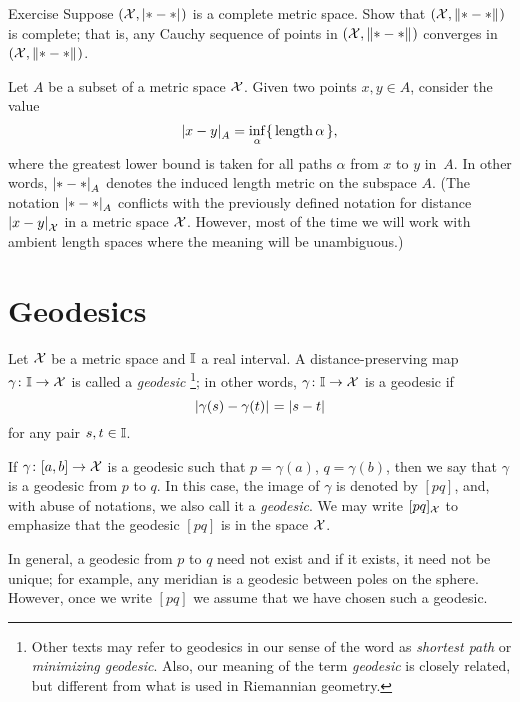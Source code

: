 \begin{thm}{Exercise}\label{ex:compact=>complete}
Suppose $(\mathcal{X},|{*}-{*}|_{}^{{}})$ is a complete metric space.
Show that $(\mathcal{X},\|{*}-{*}\|_{}^{{}})$ is complete;
that is, any Cauchy sequence of points in $(\mathcal{X},\|{*}-{*}\|_{}^{{}})$ converges in $(\mathcal{X},\|{*}-{*}\|_{}^{{}})$.
\end{thm}

Let $A$ be a subset of a metric space $\mathcal{X}$.
Given two points $x,y\in A$,
consider the value
\[|{x}-{y}|_{A}^{{}}=\inf_{\alpha}\{\,\mathop{\rm length}\nolimits\alpha\,\},
\]
where the greatest lower bound is taken for all paths $\alpha$ from $x$ to $y$ in~$A$.
In other words, $|{*}-{*}|_{A}^{{}}$ denotes the induced length metric on the subspace $A$.
(The notation $|{*}-{*}|_{A}^{{}}$ conflicts with the previously defined notation for distance $|{x}-{y}|_{\mathcal{X}}^{{}}$ in a metric space $\mathcal{X}$.
However, most of the time we will work with ambient length spaces where the meaning will be unambiguous.)

\section{Geodesics}

Let $\mathcal{X}$ be a metric space 
and $\mathbb{I}$ a real interval. 
A distance-preserving map $\gamma\colon\mathbb{I}\to \mathcal{X}$ is called a \emph{geodesic}%
\footnote{Other texts  may refer to geodesics in our sense of the word as  \textit{shortest path} or \textit{minimizing geodesic}.
Also, our meaning of the term \textit{geodesic} is closely related, but different from what is used in Riemannian geometry.};
in other words, $\gamma\colon\mathbb{I}\to \mathcal{X}$ is a geodesic if 
\[|{\gamma(s)}-{\gamma(t)}|_{}^{{}}=|s-t|\]
for any pair $s,t\in \mathbb{I}$.

If $\gamma\colon[a,b]\to \mathcal{X}$ is a geodesic such that $p=\gamma(a)$, $q=\gamma(b)$, then we say that $\gamma$ is a geodesic from $p$ to $q$.
In this case, the image of $\gamma$ is denoted by $[p q]$, and, with abuse of notations, we also call it a \emph{geodesic}.
We may write $[p q]_{\mathcal{X}}$ 
to emphasize that the geodesic $[p q]$ is in the space  ${\mathcal{X}}$.

In general, a geodesic from $p$ to $q$ need not exist and if it exists, it need not  be unique;
for example, any meridian is a geodesic between poles on the sphere.
However, once we write $[p q]$ we assume that we have chosen such a geodesic.

